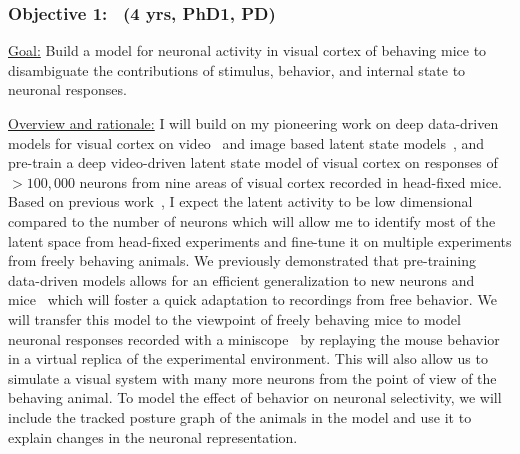 \documentclass[COG,11pt]{ercgrant}
\begin{document}



\subsubsection{Objective 1: \oonetitle~(4 yrs, PhD1, PD)\hfill{}}
\underline{Goal:} Build a model for neuronal activity in visual cortex of behaving mice to disambiguate the contributions of stimulus, behavior, and internal state to neuronal responses. 


\underline{Overview and rationale:}
I will build on my pioneering work on deep data-driven models for visual cortex on video~\parencite{Sinz2018-sk} and image based latent state models~\parencite{Bashiri2021-or}, and pre-train a deep video-driven latent state model of visual cortex on responses of $>100,000$ neurons from nine areas of visual cortex recorded in head-fixed mice.
Based on previous work~\parencite{Stringer2019-lt}, I expect the latent activity to be low dimensional compared to the number of neurons which will allow me to identify most of the latent space from head-fixed experiments and fine-tune it on multiple experiments from freely behaving animals. 
We previously demonstrated that pre-training data-driven models allows for an efficient generalization to new neurons and mice~\parencite{Lurz2020-ua} which will foster a quick adaptation to recordings from free behavior. 
We will transfer this model to the viewpoint of freely behaving mice to model neuronal responses recorded with a miniscope~\parencite{Cadena2017-rb} by replaying the mouse behavior in a virtual replica of the experimental environment. 
This will also allow us to simulate a visual system with many more neurons from the point of view of the behaving animal.
To model the effect of behavior on neuronal selectivity, we will include the tracked posture graph of the animals in the model and use it to explain changes in the neuronal representation.
\end{document}
